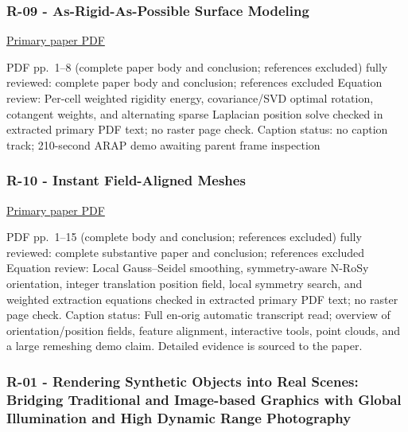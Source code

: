 \subsubsection{R-09 - As-Rigid-As-Possible Surface Modeling}\label{04-visual-computing-ii-ch036-r-09---as-rigid-as-possible-surface-modeling}

\href{https://igl.ethz.ch/projects/ARAP/arap_web.pdf}{Primary paper PDF}

PDF pp.~1--8 (complete paper body and conclusion; references excluded) fully reviewed: complete paper body and conclusion; references excluded Equation review: Per-cell weighted rigidity energy, covariance/SVD optimal rotation, cotangent weights, and alternating sparse Laplacian position solve checked in extracted primary PDF text; no raster page check. Caption status: no caption track; 210-second ARAP demo awaiting parent frame inspection

\subsubsection{R-10 - Instant Field-Aligned Meshes}\label{04-visual-computing-ii-ch036-r-10---instant-field-aligned-meshes}

\href{https://igl.ethz.ch/projects/instant-meshes/instant-meshes-SA-2015-jakob-et-al-compressed.pdf}{Primary paper PDF}

PDF pp.~1--15 (complete body and conclusion; references excluded) fully reviewed: complete substantive paper and conclusion; references excluded Equation review: Local Gauss--Seidel smoothing, symmetry-aware N-RoSy orientation, integer translation position field, local symmetry search, and weighted extraction equations checked in extracted primary PDF text; no raster page check. Caption status: Full en-orig automatic transcript read; overview of orientation/position fields, feature alignment, interactive tools, point clouds, and a large remeshing demo claim. Detailed evidence is sourced to the paper.

\subsubsection{R-01 - Rendering Synthetic Objects into Real Scenes: Bridging Traditional and Image-based Graphics with Global Illumination and High Dynamic Range Photography}\label{04-visual-computing-ii-ch036-r-01---rendering-synthetic-objects-into-real-scenes-bridging-traditional-and-image-based-graphics-with-global-illumination-and-high-dynamic-range-photography}

